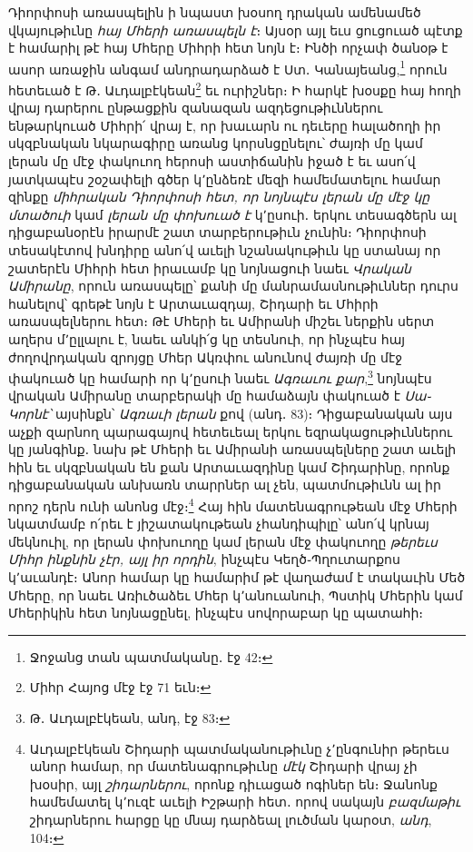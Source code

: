 \documentclass{article}
\begin{document}
{Դիորփոսի առասպելին ի նպաստ խօսող դրական ամենամեծ վկայութիւնը \emph{հայ Մհերի առասպելն է}։ Այսօր այլ եւս ցուցուած պէտք է համարիլ թէ հայ Մհերը Միհրի հետ նոյն է։ Ինծի որչափ ծանօթ է ասոր առաջին անգամ անդրադարձած է Ստ․ Կանայեանց,\footnote{Ջոջանց տան պատմականը․ էջ 42։} որուն հետեւած է Թ․ Աւդալբէկեան\footnote{Միհր Հայոց մէջ էջ 71 եւն։} եւ ուրիշներ։ Ի հարկէ խօսքը հայ հողի վրայ դարերու ընթացքին զանազան ազդեցութիւններու ենթարկուած Միհրի՛ վրայ է, որ խաւարն ու դեւերը հալածողի իր սկզբնական նկարագիրը առանց կորսնցընելու՝ ժայռի մը կամ լերան մը մէջ փակուող հերոսի աստիճանին իջած է եւ ասո՛վ յատկապէս շօշափելի գծեր կ՚ընձեռէ մեզի համեմատելու համար զինքը \emph{միհրական Դիորփոսի հետ, որ նոյնպէս լերան մը մէջ կը մտածուի} կամ \emph{լերան մը փոխուած է} կ՚ըսուի․ երկու տեսագծերն ալ դիցաբանօրէն իրարմէ շատ տարբերութիւն չունին։ Դիորփոսի տեսակէտով խնդիրը անո՛վ աւելի նշանակութիւն կը ստանայ որ շատերէն Միհրի հետ իրաւամբ կը նոյնացուի նաեւ \emph{Վրական Ամիրանը}, որուն առասպելը՝ քանի մը մանրամասնութիւններ դուրս հանելով՝ գրեթէ նոյն է Արտաւազդայ, Շիդարի եւ Մհիրի առասպելներու հետ։ Թէ Մհերի եւ Ամիրանի միշեւ ներքին սերտ աղերս մ՚ըլլալու է, նաեւ անկի՛ց կը տեսնուի, որ ինչպէս հայ ժողովրդական զրոյցը Մհեր Ակռփու անունով ժայռի մը մէջ փակուած կը համարի որ կ՚ըսուի նաեւ \emph{Ագռաւու քար},\footnote{Թ․ Աւդալբէկեան, անդ, էջ 83։} նոյնպէս վրական Ամիրանը տարբերակի մը համաձայն փակուած է \emph{Սա֊Կորնէ՝} այսինքն՝ \emph{Ագռաւի լերան} քով (անդ․ 83)։ Դիցաբանական այս աչքի զարնող պարագայով հետեւեալ երկու եզրակացութիւններու կը յանգինք․ նախ թէ Մհերի եւ Ամիրանի առասպելները շատ աւելի հին եւ սկզբնական են քան Արտաւազդինը կամ Շիդարինը, որոնք դիցաբանական անխառն տարրներ ալ չեն, պատմութիւնն ալ իր որոշ դերն ունի անոնց մէջ։\footnote{Աւդալբէկեան Շիդարի պատմականութիւնը չ՚ընգունիր թերեւս անոր համար, որ մատենագրութիւնը \emph{մէկ} Շիդարի վրայ չի խօսիր, այլ \emph{շիդարներու}, որոնք դիւացած ոգիներ են։ Ջանոնք համեմատել կ՚ուզէ աւելի Իշթարի հետ․ որով սակայն \emph{բազմաթիւ} շիդարներու հարցը կը մնայ դարձեալ լուծման կարօտ, \emph{անդ}, 104։} Հայ հին մատենագրութեան մէջ Մհերի նկատմամբ ո՛րեւ է յիշատակութեան չհանդիպիլը՝ անո՛վ կրնայ մեկնուիլ, որ լերան փոխուողը կամ լերան մէջ փակուողը \emph{թերեւս Միհր ինքնին չէր, այլ իր որդին}, ինչպէս Կեղծ֊Պղուտարքոս կ՚աւանդէ։ Անոր համար կը համարիմ թէ վաղաժամ է տակաւին Մեծ Մհերը, որ նաեւ Առիւծաձեւ Մհեր կ՚անուանուի, Պստիկ Մհերին կամ Մհերիկին հետ նոյնացընել, ինչպէս սովորաբար կը պատահի։

}
\end{document}
